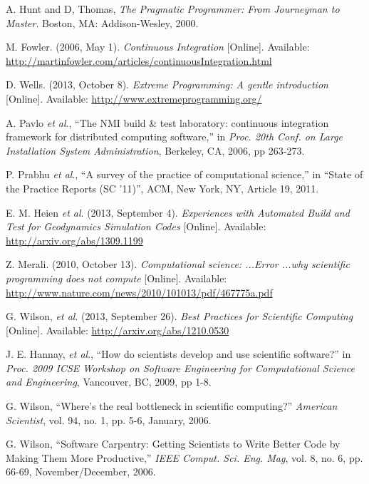 \documentclass[conference]{IEEEtran}
\begin{document}
\begin{thebibliography}{1}

A. Hunt and D, Thomas, \emph{The Pragmatic Programmer: From Journeyman to Master}. Boston, MA: Addison-Wesley, 2000.

M. Fowler. (2006, May 1). \emph{Continuous Integration} [Online]. Available: \url{http://martinfowler.com/articles/continuousIntegration.html}

D. Wells. (2013, October 8). \emph{Extreme Programming: A gentle introduction} [Online]. Available: \url{http://www.extremeprogramming.org/}

A. Pavlo \emph{et al}., ``The NMI build \& test laboratory: continuous integration framework for distributed computing software,'' in \emph{Proc. 20th Conf. on Large Installation System Administration}, Berkeley, CA, 2006, pp 263-273.

P. Prabhu \emph{et al}., ``A survey of the practice of computational science,'' in ``State of the Practice Reports (SC '11)'', ACM, New York, NY, Article 19, 2011.

E. M. Heien \emph{et al}. (2013, September 4). \emph{Experiences with Automated Build and Test for Geodynamics Simulation Codes} [Online]. Available: \url{http://arxiv.org/abs/1309.1199}

Z. Merali. (2010, October 13). \emph{Computational science: ...Error ...why scientific programming does not compute} [Online]. Available: \url{http://www.nature.com/news/2010/101013/pdf/467775a.pdf}

G. Wilson, \emph{et al}. (2013, September 26). \emph{Best Practices for Scientific Computing} [Online]. Available: \url{http://arxiv.org/abs/1210.0530}

J. E. Hannay, \emph{et al}., ``How do scientists develop and use scientific software?'' in \emph{Proc. 2009 ICSE Workshop on Software Engineering for Computational Science and Engineering}, Vancouver, BC, 2009, pp 1-8.

G. Wilson, ``Where's the real bottleneck in scientific computing?'' \emph{American Scientist}, vol. 94, no. 1, pp. 5-6, January, 2006.

G. Wilson, ``Software Carpentry: Getting Scientists to Write Better Code by Making Them More Productive,'' \emph{IEEE Comput. Sci. Eng. Mag}, vol. 8, no. 6, pp. 66-69, November/December, 2006.


\end{thebibliography}
\end{document}
